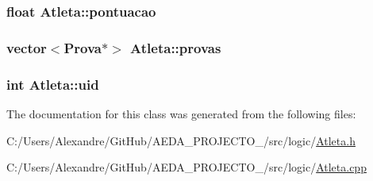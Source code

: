 \subsubsection[{pontuacao}]{\setlength{\rightskip}{0pt plus 5cm}float Atleta\+::pontuacao\hspace{0.3cm}{\ttfamily [private]}}\label{class_atleta_ac7fb325ccbe94fe9494d54da4c08b045}
\hypertarget{class_atleta_aefafb252cadc4ab80434bb697674e865}{}
\subsubsection[{provas}]{\setlength{\rightskip}{0pt plus 5cm}vector$<${\bf Prova}$\ast$$>$ Atleta\+::provas\hspace{0.3cm}{\ttfamily [private]}}\label{class_atleta_aefafb252cadc4ab80434bb697674e865}
\hypertarget{class_atleta_ae471f8c198a8a84275afa23598e03d44}{}
\subsubsection[{uid}]{\setlength{\rightskip}{0pt plus 5cm}int Atleta\+::uid\hspace{0.3cm}{\ttfamily [private]}}\label{class_atleta_ae471f8c198a8a84275afa23598e03d44}


The documentation for this class was generated from the following files\+:\begin{DoxyCompactItemize}
\item 
C\+:/\+Users/\+Alexandre/\+Git\+Hub/\+A\+E\+D\+A\+\_\+\+P\+R\+O\+J\+E\+C\+T\+O\+\_/src/logic/\hyperlink{_atleta_8h}{Atleta.\+h}\item 
C\+:/\+Users/\+Alexandre/\+Git\+Hub/\+A\+E\+D\+A\+\_\+\+P\+R\+O\+J\+E\+C\+T\+O\+\_/src/logic/\hyperlink{_atleta_8cpp}{Atleta.\+cpp}\end{DoxyCompactItemize}
